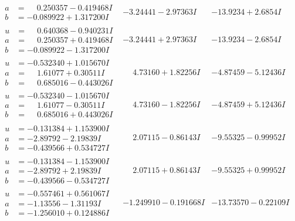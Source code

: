 \documentclass[1p]{elsarticle_modified}
\theoremstyle{definition}
\begin{document}
$$\begin{array}{c|c|c}
\begin{aligned}
a &= \phantom{-}0.250357 - 0.419468 I \\
b &= -0.089922 + 1.317200 I\end{aligned}
 & -3.24441 - 2.97363 I & -13.9234 + 2.6854 I \\ \hline\begin{aligned}
u &= \phantom{-}0.640368 - 0.940231 I \\
a &= \phantom{-}0.250357 + 0.419468 I \\
b &= -0.089922 - 1.317200 I\end{aligned}
 & -3.24441 + 2.97363 I & -13.9234 - 2.6854 I \\ \hline\begin{aligned}
u &= -0.532340 + 1.015670 I \\
a &= \phantom{-}1.61077 + 0.30511 I \\
b &= \phantom{-}0.685016 - 0.443026 I\end{aligned}
 & \phantom{-}4.73160 + 1.82256 I & -4.87459 - 5.12436 I \\ \hline\begin{aligned}
u &= -0.532340 - 1.015670 I \\
a &= \phantom{-}1.61077 - 0.30511 I \\
b &= \phantom{-}0.685016 + 0.443026 I\end{aligned}
 & \phantom{-}4.73160 - 1.82256 I & -4.87459 + 5.12436 I \\ \hline\begin{aligned}
u &= -0.131384 + 1.153900 I \\
a &= -2.89792 - 2.19839 I \\
b &= -0.439566 + 0.534727 I\end{aligned}
 & \phantom{-}2.07115 - 0.86143 I & -9.55325 - 0.99952 I \\ \hline\begin{aligned}
u &= -0.131384 - 1.153900 I \\
a &= -2.89792 + 2.19839 I \\
b &= -0.439566 - 0.534727 I\end{aligned}
 & \phantom{-}2.07115 + 0.86143 I & -9.55325 + 0.99952 I \\ \hline\begin{aligned}
u &= -0.557461 + 0.561067 I \\
a &= -1.13556 - 1.31193 I \\
b &= -1.256010 + 0.124886 I\end{aligned}
 & -1.249910 - 0.191668 I & -13.73570 - 0.22109 I \\ \hline\begin{aligned}

\end{aligned}
\end{array}$$
\end{document}
